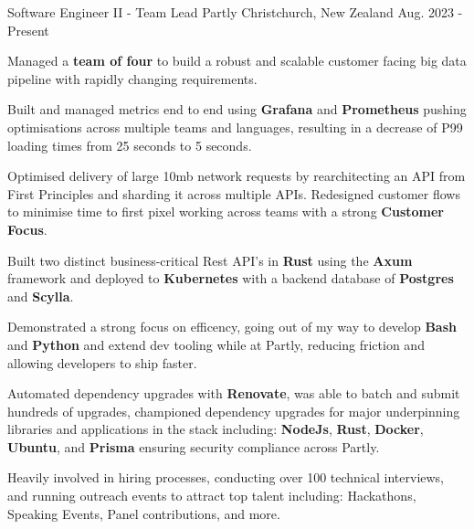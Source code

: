 
\begin{cventries}
  \cventry
    {Software Engineer II - Team Lead}
    {Partly}
    {Christchurch, New Zealand}
    {Aug. 2023 - Present}
    {
      \begin{cvitems}
        \item {Managed a \textbf{team of four} to build a robust and scalable customer facing big data pipeline with rapidly changing requirements.}
        \item {Built and managed metrics end to end using \textbf{Grafana} and \textbf{Prometheus} pushing optimisations across multiple teams and languages, resulting in a decrease of P99 loading times from 25 seconds to 5 seconds.}
        \item {Optimised delivery of large 10mb network requests by rearchitecting an API from First Principles and sharding it across multiple APIs. Redesigned customer flows to minimise time to first pixel working across teams with a strong \textbf{Customer Focus}.}
        \item {Built two distinct business-critical Rest API's in \textbf{Rust} using the \textbf{Axum} framework and deployed to \textbf{Kubernetes} with a backend database of \textbf{Postgres} and \textbf{Scylla}.}
        \item {Demonstrated a strong focus on efficency, going out of my way to develop \textbf{Bash} and \textbf{Python} and extend dev tooling while at Partly, reducing friction and allowing developers to ship faster.}
        \item {Automated dependency upgrades with \textbf{Renovate}, was able to batch and submit hundreds of upgrades, championed dependency upgrades for major underpinning libraries and applications in the stack including: \textbf{NodeJs}, \textbf{Rust}, \textbf{Docker}, \textbf{Ubuntu}, and \textbf{Prisma} ensuring security compliance across Partly.} %
        \item {Heavily involved in hiring processes, conducting over 100 technical interviews, and running outreach events to attract top talent including: Hackathons, Speaking Events, Panel contributions, and more.}

\end{cvitems}}
\end{cventries}
